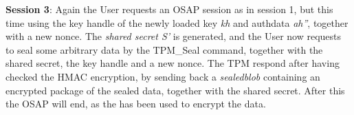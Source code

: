 \textbf{Session 3}: Again the User requests an OSAP session as in session 1, but this time using the key handle of the newly loaded key \textit{kh} and authdata \textit{ah''}, together with a new nonce. The \textit{shared secret S'} is generated, and the User now requests to seal some arbitrary data by the TPM\_Seal command, together with the shared secret, the key handle and a new nonce. The TPM respond after having checked the HMAC encryption, by sending back a \textit{sealedblob} containing an encrypted package of the sealed data, together with the shared secret. After this the OSAP will end, as the has been used to encrypt the data.
% 


